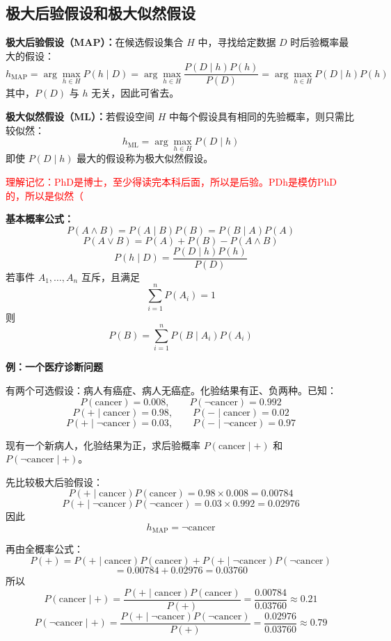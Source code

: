 \documentclass[../main.tex]{subfiles}
\begin{document}
\subsection{极大后验假设和极大似然假设}\label{sec:map-ml}
\begin{enumerate}
    \item \textbf{极大后验假设（MAP）：}在候选假设集合 $H$ 中，寻找给定数据 $D$ 时后验概率最大的假设：
    $$
    h_{\mathrm{MAP}}=\arg\max_{h\in H}P(h\mid D)
    =\arg\max_{h\in H}\frac{P(D\mid h)P(h)}{P(D)}
    =\arg\max_{h\in H}P(D\mid h)P(h)
    $$
    其中，$P(D)$ 与 $h$ 无关，因此可省去。

    \item \textbf{极大似然假设（ML）：}若假设空间 $H$ 中每个假设具有相同的先验概率，则只需比较似然：
    $$
    h_{\mathrm{ML}}=\arg\max_{h\in H}P(D\mid h)
    $$
    即使 $P(D\mid h)$ 最大的假设称为极大似然假设。
    
    \textcolor{red}{理解记忆：PhD是博士，至少得读完本科后面，所以是后验。PDh是模仿PhD的，所以是似然（}
    
    \item \textbf{基本概率公式：}
    $$
    P(A\land B)=P(A\mid B)P(B)=P(B\mid A)P(A)
    $$
    $$
    P(A\lor B)=P(A)+P(B)-P(A\land B)
    $$
    $$
    P(h\mid D)=\frac{P(D\mid h)P(h)}{P(D)}
    $$
    若事件 $A_1,\dots,A_n$ 互斥，且满足
    $$
    \sum_{i=1}^{n}P(A_i)=1
    $$
    则
    $$
    P(B)=\sum_{i=1}^{n}P(B\mid A_i)P(A_i)
    $$
    \label{cancer}
    {\small\kaishu
    \item \textbf{例：一个医疗诊断问题}

    有两个可选假设：病人有癌症、病人无癌症。化验结果有正、负两种。已知：
    $$
    P(\mathrm{cancer})=0.008,\qquad P(\neg \mathrm{cancer})=0.992
    $$
    $$
    P(+\mid \mathrm{cancer})=0.98,\qquad P(-\mid \mathrm{cancer})=0.02
    $$
    $$
    P(+\mid \neg \mathrm{cancer})=0.03,\qquad P(-\mid \neg \mathrm{cancer})=0.97
    $$

    现有一个新病人，化验结果为正，求后验概率 $P(\mathrm{cancer}\mid +)$ 和 $P(\neg \mathrm{cancer}\mid +)$。

    先比较极大后验假设：
    $$
    P(+\mid \mathrm{cancer})P(\mathrm{cancer})=0.98\times 0.008=0.00784
    $$
    $$
    P(+\mid \neg \mathrm{cancer})P(\neg \mathrm{cancer})=0.03\times 0.992=0.02976
    $$
    因此
    $$
    h_{\mathrm{MAP}}=\neg \mathrm{cancer}
    $$

    再由全概率公式：
    $$
    P(+)=P(+\mid \mathrm{cancer})P(\mathrm{cancer})+P(+\mid \neg \mathrm{cancer})P(\neg \mathrm{cancer})
    $$
    $$
    =0.00784+0.02976=0.03760
    $$
    所以
    $$
    P(\mathrm{cancer}\mid +)=\frac{P(+\mid \mathrm{cancer})P(\mathrm{cancer})}{P(+)}
    =\frac{0.00784}{0.03760}\approx 0.21
    $$
    $$
    P(\neg \mathrm{cancer}\mid +)=\frac{P(+\mid \neg \mathrm{cancer})P(\neg \mathrm{cancer})}{P(+)}
    =\frac{0.02976}{0.03760}\approx 0.79
    $$

}
\end{enumerate}
\end{document}
